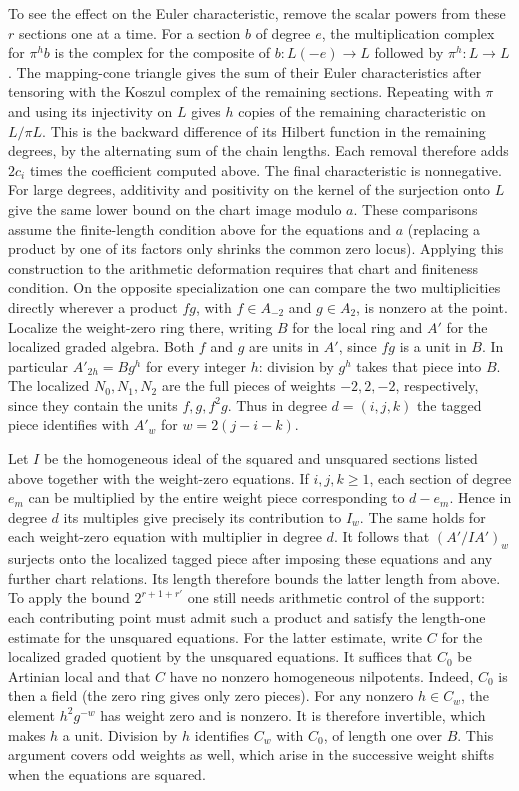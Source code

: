 \documentclass[11pt]{amsart}
\theoremstyle{definition}
\theoremstyle{remark}
\begin{document}
To see the effect on the Euler characteristic, remove the scalar
powers from these $r$ sections one at a time. For a section $b$
of degree $e$, the multiplication complex for $\pi^h b$ is the
complex for the composite of $b:L(-e)\to L$ followed by
$\pi^h:L\to L$. The mapping-cone triangle gives the sum of their
Euler characteristics after tensoring with the Koszul complex
of the remaining sections. Repeating with $\pi$ and using its
injectivity on $L$ gives $h$ copies of the remaining characteristic
on $L/\pi L$. This is the backward difference of its Hilbert
function in the remaining degrees, by the alternating sum of the
chain lengths. Each removal therefore adds $2c_i$ times the
coefficient computed above. The final characteristic is nonnegative.
For large degrees, additivity and positivity on the kernel of the
surjection onto $L$ give the same lower bound on the chart image
modulo $a$. These comparisons assume the finite-length condition
above for the equations and $a$ (replacing a product by one of its
factors only shrinks the common zero locus). Applying this construction
to the arithmetic deformation requires that chart and finiteness
condition. On the opposite specialization one can compare the two
multiplicities directly wherever a product $fg$, with $f\in A_{-2}$
and $g\in A_2$, is nonzero at the point. Localize the weight-zero
ring there, writing $B$ for the local ring and $A'$ for the localized
graded algebra. Both $f$ and $g$ are units in $A'$, since $fg$ is
a unit in $B$. In particular $A'_{2h}=Bg^h$ for every integer $h$:
division by $g^h$ takes that piece into $B$. The localized $N_0,N_1,N_2$
are the full pieces of weights $-2,2,-2$, respectively, since they
contain the units $f,g,f^2g$. Thus in degree $d=(i,j,k)$ the tagged
piece identifies with $A'_w$ for $w=2(j-i-k)$.

Let $I$ be the homogeneous ideal of the squared and unsquared sections
listed above together with the weight-zero equations. If $i,j,k\ge1$,
each section of degree $e_m$ can be multiplied by the entire weight
piece corresponding to $d-e_m$. Hence in degree $d$ its multiples
give precisely its contribution to $I_w$. The same holds for each
weight-zero equation with multiplier in degree $d$. It follows that
$(A'/I A')_w$ surjects onto the localized tagged piece after imposing
these equations and any further chart relations. Its length therefore
bounds the latter length from above. To apply the bound
$2^{r+1+r'}$ one still needs arithmetic control of the support:
each contributing point must admit such a product and satisfy the
length-one estimate for the unsquared equations. For the latter
estimate, write $C$ for the localized graded quotient by the
unsquared equations. It suffices that $C_0$ be Artinian local and
that $C$ have no nonzero homogeneous nilpotents. Indeed, $C_0$ is
then a field (the zero ring gives only zero pieces). For any nonzero
$h\in C_w$, the element $h^2g^{-w}$ has weight zero and is nonzero.
It is therefore invertible, which makes $h$ a unit. Division by
$h$ identifies $C_w$ with $C_0$, of length one over $B$. This
argument covers odd weights as well, which arise in the successive
weight shifts when the equations are squared.
\end{document}
